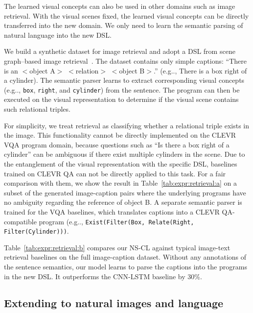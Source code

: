 \documentclass{article} %
\makeatletter
\newcommand{\tbl}[1]{Table~\ref{#1}}
\DeclareRobustCommand\onedot{\futurelet\@let@token\@onedot}
\def\@onedot{\ifx\@let@token.\else.\null\fi\xspace}
\def\eg{e.g\onedot} \def\Eg{E.g\onedot}
\newcommand{\model}{NS-CL\xspace}
\makeatother
\begin{document}
 The learned visual concepts can also be used in other domains such as image retrieval. With the visual scenes fixed, the learned visual concepts can be directly transferred into the new domain. We only need to learn the semantic parsing of natural language into the new DSL.

We build a synthetic dataset for image retrieval and adopt a DSL from scene graph--based image retrieval~\citep{Johnson2015Image}. The dataset contains only simple captions: ``There is an $<$object A$>$ $<$relation$>$ $<$object B$>$.'' (\eg, There is a box right of a cylinder). The semantic parser learns to extract corresponding visual concepts (\eg, \texttt{box}, \texttt{right}, and \texttt{cylinder}) from the sentence. The program can then be executed on the visual representation to determine if the visual scene contains such relational triples.

For simplicity, we treat retrieval as classifying whether a relational triple exists in the image. This functionality cannot be directly implemented on the CLEVR VQA program domain, because questions such as ``Is there a box right of a cylinder'' can be ambiguous if there exist multiple cylinders in the scene. Due to the entanglement of the visual representation with the specific DSL, baselines trained on CLEVR QA can not be directly applied to this task. For a fair comparison with them, we show the result in \tbl{tab:expr:retrieval:a} on a subset of the generated image-caption pairs where the underlying programs have no ambiguity regarding the reference of object B. A separate semantic parser is trained for the VQA baselines, which translates captions into a CLEVR QA-compatible program (\eg, \texttt{Exist(Filter(Box, Relate(Right, Filter(Cylinder)))}.

\tbl{tab:expr:retrieval:b} compares our \model against typical image-text retrieval baselines on the full image-caption dataset. Without any annotations of the sentence semantics, our model learns to parse the captions into the programs in the new DSL. It outperforms the CNN-LSTM baseline by 30\%. %


\subsection{Extending to natural images and language}
\end{document}
